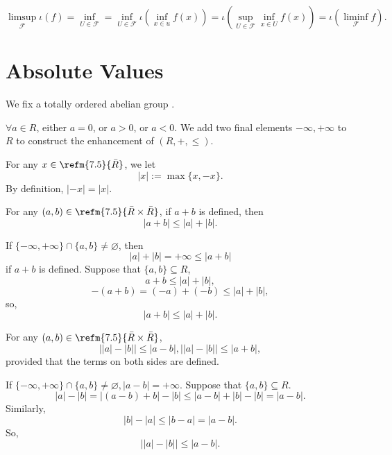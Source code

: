 \begin{proofenv}
    $$\limsup_{\mathcal{F}}\iota(f)=\inf_{U\in \mathcal{F}}=\inf_{U\in \mathcal{F}}\iota\left(\inf_{x\in u}f(x)\right)=\iota\left(\sup_{U\in \mathcal{F}}\inf_{x\in U}f(x)\right)=\iota\left(\liminf_{\mathcal{F}}f\right).$$
\end{proofenv}



\section{Absolute Values}
We fix a totally ordered abelian group .
\begin{remark}
    $\forall a\in R$, either $a=0$, or $a>0$, or $a<0$. We add two final elements $-\infty,+\infty$ to $R$ to construct the enhancement of $(R,+,\le)$.
\end{remark}
\begin{definitionenv}
    For any $x\in \refm{7.5}{\bar{R}}$, we let 
    $$\left|x\right|:=\max\{x,-x\}.$$
    By definition, $\left|-x\right|=\left|x\right|$.
\end{definitionenv}
\begin{propositionenv}
    For any $(a,b)\in \refm{7.5}{\bar{R}\times\bar{R}}$, if $a+b$ is defined, then 
    $$\left|a+b\right|\le \left|a\right|+\left| b\right|.$$
\end{propositionenv}
\begin{proofenv}
    If $\{-\infty,+\infty\}\cap\{a,b\}\not=\varnothing$, then 
    $$\left|a\right|+\left|b\right|=+\infty\le\left|a+b\right|$$
    if $a+b$ is defined. Suppose that $\{a,b\}\subseteq R$, 
    $$a+b\le \left|a\right|+\left|b\right|,$$
    $$-\left(a+b\right)=\left(-a\right)+\left(-b\right)\le \left|a\right|+\left|b\right|,$$
    so,
    $$\left|a+b\right|\le \left|a\right|+\left| b\right|.$$
\end{proofenv}
\begin{corollaryenv}
    For any $(a,b)\in \refm{7.5}{\bar{R}\times\bar{R}}$,
    $$\left|\left|a\right|-\left|b\right|\right|\le \left|a-b\right|,\left|\left|a\right|-\left|b\right|\right|\le \left|a+b\right|,$$
    provided that the terms on both sides are defined.
\end{corollaryenv}
\begin{proofenv}
    If $\{-\infty,+\infty\}\cap\{a,b\}\not=\varnothing, \left|a-b\right|=+\infty$. Suppose that $\{a,b\}\subseteq R$.
    $$\left|a\right|-\left|b\right|=\left|(a-b)+b\right|-\left|b\right|\le \left|a-b\right|+\left|b\right|-\left|b\right|=\left|a-b\right|.$$
    Similarly, 
    $$\left|b\right|-\left|a\right|\le \left|b-a\right|=\left|a-b\right|.$$
    So,
    $$\left|\left|a\right|-\left|b\right|\right|\le\left|a-b\right|.$$
\end{proofenv}
